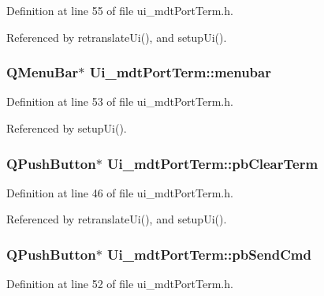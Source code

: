 Definition at line 55 of file ui\-\_\-mdt\-Port\-Term.\-h.



Referenced by retranslate\-Ui(), and setup\-Ui().

\hypertarget{class_ui__mdt_port_term_a5419a1aeb22afed330b0b969a9aedd73}{
\subsubsection[{menubar}]{\setlength{\rightskip}{0pt plus 5cm}Q\-Menu\-Bar$\ast$ Ui\-\_\-mdt\-Port\-Term\-::menubar}}\label{class_ui__mdt_port_term_a5419a1aeb22afed330b0b969a9aedd73}


Definition at line 53 of file ui\-\_\-mdt\-Port\-Term.\-h.



Referenced by setup\-Ui().

\hypertarget{class_ui__mdt_port_term_a4e5afb56bed669a17b535b33f86d7503}{
\subsubsection[{pb\-Clear\-Term}]{\setlength{\rightskip}{0pt plus 5cm}Q\-Push\-Button$\ast$ Ui\-\_\-mdt\-Port\-Term\-::pb\-Clear\-Term}}\label{class_ui__mdt_port_term_a4e5afb56bed669a17b535b33f86d7503}


Definition at line 46 of file ui\-\_\-mdt\-Port\-Term.\-h.



Referenced by retranslate\-Ui(), and setup\-Ui().

\hypertarget{class_ui__mdt_port_term_a8b7643228cb46713f6ebaece2f0add1d}{
\subsubsection[{pb\-Send\-Cmd}]{\setlength{\rightskip}{0pt plus 5cm}Q\-Push\-Button$\ast$ Ui\-\_\-mdt\-Port\-Term\-::pb\-Send\-Cmd}}\label{class_ui__mdt_port_term_a8b7643228cb46713f6ebaece2f0add1d}


Definition at line 52 of file ui\-\_\-mdt\-Port\-Term.\-h.



